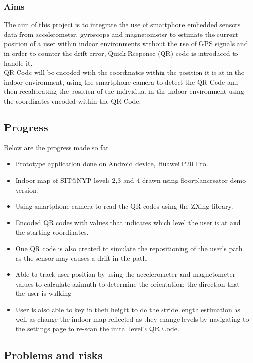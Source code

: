 \documentclass[11pt]{article}
\begin{document}
\subsubsection{Aims}\label{aims}

The aim of this project is to integrate the use of smartphone embedded sensors data from accelerometer, gyroscope and magnetometer to estimate the current position of a user within indoor environments without the use of GPS signals and in order to counter the drift error, Quick Response (QR) code is introduced to handle it.\\

QR Code will be encoded with the coordinates within the position it is at in the indoor environment, using the smartphone camera to detect the QR Code and then recalibrating the position of the individual in the indoor environment using the coordinates encoded within the QR Code.
\subsection{Progress}\label{progress}
Below are the progress made so far.
\begin{itemize}
  \item Prototype application done on Android device, Huawei P20 Pro.
  \item Indoor map of SIT@NYP levels 2,3 and 4 drawn using floorplancreator demo version.
  \item Using smartphone camera to read the QR codes using the ZXing library.
  \item Encoded QR codes with values that indicates which level the user is at and the starting coordinates.
  \item One QR code is also created to simulate the repositioning of the user's path as the sensor may causes a drift in the path.
  \item Able to track user position by using the accelerometer and magnetometer values to calculate azimuth to determine the orientation; the direction that the user is walking.
  \item User is also able to key in their height to do the stride length estimation as well as change the indoor map reflected as they change levels by navigating to the settings page to re-scan the inital level's QR Code.
\end{itemize}

\subsection{Problems and risks}\label{problems-and-risks}
\end{document}

